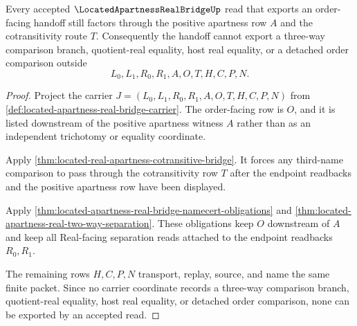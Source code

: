 \begin{theorem}
\label{thm:located-apartness-real-nontrichotomy-boundary}
Every accepted $\LocatedApartnessRealBridgeUp$ read that exports an order-facing handoff still factors through the positive apartness row $A$ and the cotransitivity route $T$. Consequently the handoff cannot export a three-way comparison branch, quotient-real equality, host real equality, or a detached order comparison outside
$$
L_0,L_1,R_0,R_1,A,O,T,H,C,P,N .
$$
\end{theorem}
\begin{proof}
Project the carrier $J=(L_0,L_1,R_0,R_1,A,O,T,H,C,P,N)$ from \autoref{def:located-apartness-real-bridge-carrier}. The order-facing row is $O$, and it is listed downstream of the positive apartness witness $A$ rather than as an independent trichotomy or equality coordinate.

Apply \autoref{thm:located-real-apartness-cotransitive-bridge}. It forces any third-name comparison to pass through the cotransitivity row $T$ after the endpoint readbacks and the positive apartness row have been displayed.

Apply \autoref{thm:located-apartness-real-bridge-namecert-obligations} and \autoref{thm:located-apartness-real-two-way-separation}. These obligations keep $O$ downstream of $A$ and keep all Real-facing separation reads attached to the endpoint readbacks $R_0,R_1$.

The remaining rows $H,C,P,N$ transport, replay, source, and name the same finite packet. Since no carrier coordinate records a three-way comparison branch, quotient-real equality, host real equality, or detached order comparison, none can be exported by an accepted read.
\end{proof}

